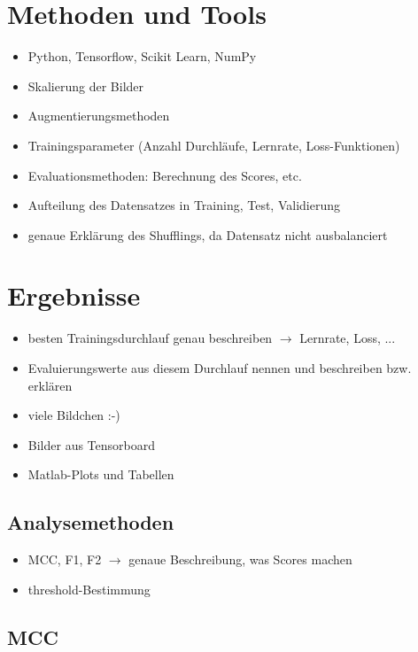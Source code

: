 \documentclass[a4paper, doc]{apa6}
\begin{document}
\section{Methoden und Tools}

\begin{itemize}
	\item Python, Tensorflow, Scikit Learn, NumPy
	\item Skalierung der Bilder
	\item Augmentierungsmethoden
	\item Trainingsparameter (Anzahl Durchläufe, Lernrate, Loss-Funktionen)
	\item Evaluationsmethoden: Berechnung des Scores, etc.
	\item Aufteilung des Datensatzes in Training, Test, Validierung
	\item genaue Erklärung des Shufflings, da Datensatz nicht ausbalanciert
\end{itemize}

\section{Ergebnisse}
\begin{itemize}
	\item besten Trainingsdurchlauf genau beschreiben $\rightarrow$ Lernrate, Loss, ...
	\item Evaluierungswerte aus diesem Durchlauf nennen und beschreiben bzw. erklären
	\item viele Bildchen :-) 
	\item Bilder aus Tensorboard
	\item Matlab-Plots und Tabellen 
\end{itemize}

\subsection{Analysemethoden}

\begin{itemize}
	\item MCC, F1, F2 $\rightarrow$ genaue Beschreibung, was Scores machen 
	\item threshold-Bestimmung 
\end{itemize}

\subsection{MCC}
\end{document}
